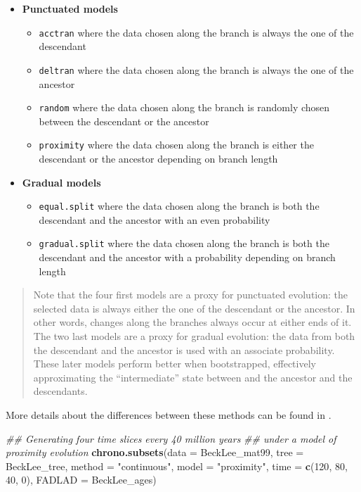 \documentclass[]{book}
\newenvironment{Shaded}{\begin{snugshade}}{\end{snugshade}}
\newcommand{\CommentTok}[1]{\textcolor[rgb]{0.56,0.35,0.01}{\textit{#1}}}
\newcommand{\DataTypeTok}[1]{\textcolor[rgb]{0.13,0.29,0.53}{#1}}
\newcommand{\DecValTok}[1]{\textcolor[rgb]{0.00,0.00,0.81}{#1}}
\newcommand{\KeywordTok}[1]{\textcolor[rgb]{0.13,0.29,0.53}{\textbf{#1}}}
\newcommand{\NormalTok}[1]{#1}
\newcommand{\StringTok}[1]{\textcolor[rgb]{0.31,0.60,0.02}{#1}}
\providecommand{\tightlist}{%
  \setlength{\itemsep}{0pt}\setlength{\parskip}{0pt}}
\begin{document}
\begin{itemize}
\tightlist
\item
  \textbf{Punctuated models}

  \begin{itemize}
  \tightlist
  \item
    \texttt{acctran} where the data chosen along the branch is always the one of the descendant
  \item
    \texttt{deltran} where the data chosen along the branch is always the one of the ancestor
  \item
    \texttt{random} where the data chosen along the branch is randomly chosen between the descendant or the ancestor
  \item
    \texttt{proximity} where the data chosen along the branch is either the descendant or the ancestor depending on branch length
  \end{itemize}
\item
  \textbf{Gradual models}

  \begin{itemize}
  \tightlist
  \item
    \texttt{equal.split} where the data chosen along the branch is both the descendant and the ancestor with an even probability
  \item
    \texttt{gradual.split} where the data chosen along the branch is both the descendant and the ancestor with a probability depending on branch length
  \end{itemize}
\end{itemize}

\begin{quote}
Note that the four first models are a proxy for punctuated evolution: the selected data is always either the one of the descendant or the ancestor.
In other words, changes along the branches always occur at either ends of it.
The two last models are a proxy for gradual evolution: the data from both the descendant and the ancestor is used with an associate probability.
These later models perform better when bootstrapped, effectively approximating the ``intermediate'' state between and the ancestor and the descendants.
\end{quote}

More details about the differences between these methods can be found in \citet{time-slice}.

\begin{Shaded}
\begin{Highlighting}[]
\CommentTok{## Generating four time slices every 40 million years}
\CommentTok{## under a model of proximity evolution}
\KeywordTok{chrono.subsets}\NormalTok{(}\DataTypeTok{data =}\NormalTok{ BeckLee_mat99, }\DataTypeTok{tree =}\NormalTok{ BeckLee_tree, }
               \DataTypeTok{method =} \StringTok{"continuous"}\NormalTok{, }\DataTypeTok{model =} \StringTok{"proximity"}\NormalTok{,}
               \DataTypeTok{time =} \KeywordTok{c}\NormalTok{(}\DecValTok{120}\NormalTok{, }\DecValTok{80}\NormalTok{, }\DecValTok{40}\NormalTok{, }\DecValTok{0}\NormalTok{),}
               \DataTypeTok{FADLAD =}\NormalTok{ BeckLee_ages)}
\end{Highlighting}
\end{Shaded}
\end{document}
